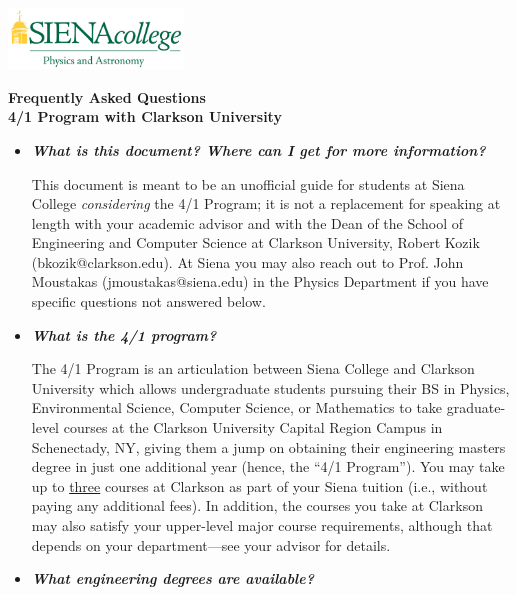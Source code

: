 \documentclass[12pt]{article}
\begin{document}
\hfill \includegraphics[width=0.35\textwidth]{siena_phys_astro_print_crop.jpg}

\vspace{0.2cm}
\begin{center}
{\LARGE {\bf Frequently Asked Questions}} \\
\medskip
{\Large {\bf 4/1 Program with Clarkson University}} 
\end{center}
\vspace{0.3cm}


\begin{itemize}
\item{{\bf {\em What is this document? Where can I get for more information?}} 

This document is meant to be an unofficial guide for students at Siena College
\emph{considering} the 4/1 Program; it is not a replacement for speaking at
length with your academic advisor and with the Dean of the School of Engineering
and Computer Science at Clarkson University, Robert Kozik (bkozik@clarkson.edu).
At Siena you may also reach out to Prof. John Moustakas (jmoustakas@siena.edu)
in the Physics Department if you have specific questions not answered below.}

\item{{\bf {\em What is the 4/1 program?}}

The 4/1 Program is an articulation between Siena College and Clarkson University
which allows undergraduate students pursuing their BS in Physics, Environmental
Science, Computer Science, or Mathematics to take graduate-level courses at the
Clarkson University Capital Region Campus in Schenectady, NY, giving them a jump
on obtaining their engineering masters degree in just one additional year
(hence, the ``4/1 Program'').  You may take up to \underline{three} courses at
Clarkson as part of your Siena tuition (i.e., without paying any additional
fees).  In addition, the courses you take at Clarkson may also satisfy your
upper-level major course requirements, although that depends on your
department---see your advisor for details.}

\item{{\bf {\em What engineering degrees are available?}}

}
\end{itemize}
\end{document}
